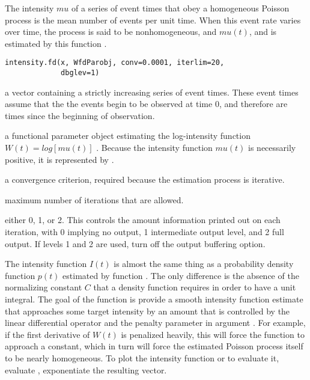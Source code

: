 \documentclass{article}
\begin{document}
\begin{Description}\relax
The intensity $mu$ of a series of event times that obey a
homogeneous Poisson process is the mean number of events per unit time.
When this event rate varies over time, the process is said to be
nonhomogeneous, and $mu(t)$, and is estimated by this function
.
\end{Description}
\begin{Usage}
\begin{verbatim}
intensity.fd(x, WfdParobj, conv=0.0001, iterlim=20,
             dbglev=1)
\end{verbatim}
\end{Usage}
\begin{Arguments}
\begin{ldescription}
\item[\code{x}] a vector containing a strictly increasing series of event times.
These event times assume that the the events begin to be observed
at time 0, and therefore are times since the beginning of
observation.

\item[\code{WfdParobj}] a functional parameter object estimating the log-intensity function
$W(t) = log[mu(t)]$ .
Because the intensity function $mu(t)$ is necessarily positive,
it is represented by .

\item[\code{conv}] a convergence criterion, required because the estimation
process is iterative.

\item[\code{iterlim}] maximum number of iterations that are allowed.

\item[\code{dbglev}] either 0, 1, or 2.  This controls the amount information printed out on
each iteration, with 0 implying no output, 1 intermediate output level,
and 2 full output.  If levels 1 and 2 are used, turn off the output
buffering option.

\end{ldescription}
\end{Arguments}
\begin{Details}\relax
The intensity function $I(t)$ is almost the same thing as a
probability density function $p(t)$ estimated by function
.  The only difference is the absence of
the normalizing constant $C$ that a density function requires
in order to have a unit integral.
The goal of the function is provide a smooth intensity function
estimate that approaches some target intensity by an amount that is
controlled by the linear differential operator  and
the penalty parameter in argument .
For example, if the first derivative of
$W(t)$ is penalized heavily, this will force the function to
approach a constant, which in turn will force the estimated Poisson
process itself to be nearly homogeneous.
To plot the intensity function or to evaluate it,
evaluate , exponentiate the resulting vector.
\end{Details}
\end{document}
